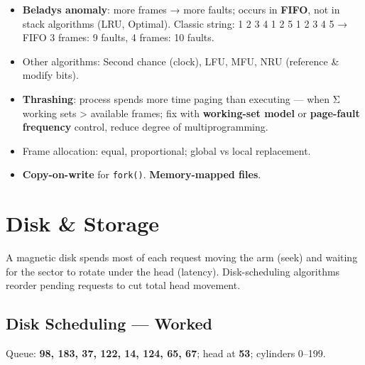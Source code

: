 \begin{itemize}
\tightlist
\item
  \textbf{Belady\textquotesingle s anomaly}: more frames → more faults; occurs in \textbf{FIFO}, not in stack algorithms (LRU, Optimal).
  Classic string: 1 2 3 4 1 2 5 1 2 3 4 5 → FIFO 3 frames: 9 faults, 4 frames: 10 faults.
\item
  Other algorithms: Second chance (clock), LFU, MFU, NRU (reference \& modify bits).
\item
  \textbf{Thrashing}: process spends more time paging than executing --- when Σ working sets \textgreater{} available frames; fix with \textbf{working-set model} or \textbf{page-fault frequency} control, reduce degree of multiprogramming.
\item
  Frame allocation: equal, proportional; global vs local replacement.
\item
  \textbf{Copy-on-write} for \texttt{fork()}. \textbf{Memory-mapped files}.
\end{itemize}

\needspace{226pt}

\hypertarget{p2-05--8-disk--storage}{%
\section{Disk \& Storage}\label{p2-05--8-disk--storage}}

A magnetic disk spends most of each request moving the arm (seek) and waiting for the sector to rotate under
the head (latency). Disk-scheduling algorithms reorder pending requests to cut total head movement.

\needspace{160pt}

\hypertarget{p2-05--81-disk-scheduling--worked}{%
\subsection{Disk Scheduling --- Worked}\label{p2-05--81-disk-scheduling--worked}}

Queue: \textbf{98, 183, 37, 122, 14, 124, 65, 67}; head at \textbf{53}; cylinders 0--199.

\begingroup\small

